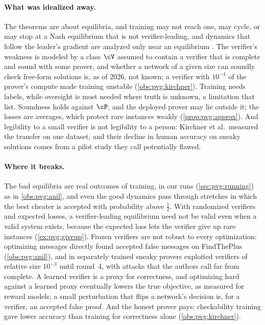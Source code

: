 \begin{refsection}
\paragraph{What was idealized away.} The theorems are about equilibria, and training may not reach one, may cycle, or may stop at a Nash equilibrium that is not verifier-leading, and dynamics that follow the leader's gradient are analyzed only near an equilibrium \parencite{FiezChasnovRatliff2020}. The verifier's weakness is modeled by a class $\cV$ assumed to contain a verifier that is complete and sound with some prover, and whether a network of a given size can soundly check free-form solutions is, as of 2026, not known; a verifier with $10^{-4}$ of the prover's compute made training unstable (\cref{obs:pvg:kirchner}). Training needs labels, while oversight is most needed where truth is unknown, a limitation that \textcite{KirchnerEtAl2024} list. Soundness holds against $\cP$, and the deployed prover may lie outside it; the losses are averages, which protect rare instances weakly (\cref{prop:pvg:approx}). And legibility to a small verifier is not legibility to a person: Kirchner et al.\ measured the transfer on one dataset, and their decline in human accuracy on sneaky solutions comes from a pilot study they call potentially flawed.

\paragraph{Where it breaks.} The bad equilibria are real outcomes of training, in our runs (\cref{sec:pvg:running}) as in \cref{obs:pvg:anil}, and even the good dynamics pass through stretches in which the best cheater is accepted with probability above $\frac12$. With randomized verifiers and expected losses, a verifier-leading equilibrium need not be valid even when a valid system exists, because the expected loss lets the verifier give up rare instances (\cref{ex:pvg:giveup}). Frozen verifiers are not robust to every optimization: optimizing messages directly found accepted false messages on FindThePlus (\cref{obs:pvg:anil}), and in \textcite{KirchnerEtAl2024} separately trained sneaky provers exploited verifiers of relative size $10^{-3}$ until round~4, with attacks that the authors call far from complete. A learned verifier is a proxy for correctness, and optimizing hard against a learned proxy eventually lowers the true objective, as \textcite{GaoSchulmanHilton2023} measured for reward models; a small perturbation that flips a network's decision \parencite{SzegedyEtAl2014} is, for a verifier, an accepted false proof. And the honest prover pays: checkability training gave lower accuracy than training for correctness alone (\cref{obs:pvg:kirchner}).


\end{refsection}
